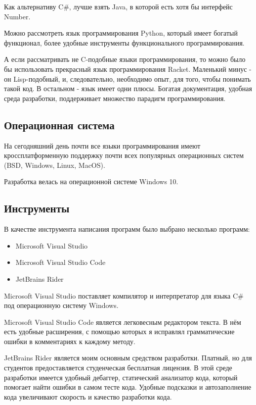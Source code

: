 Как альтернативу C\#, лучше взять Java, в которой есть хотя бы интерфейс Number.

Можно рассмотреть язык программирования Python, который имеет богатый функционал, более удобные инструменты функционального программирования. 

А если рассматривать не C-подобные языки программирования, то можно было бы использовать прекрасный язык программирования Racket. Маленький минус - он Lisp-подобный, и, следовательно, необходимо опыт, для того, чтобы понимать такой код. В остальном - язык имеет одни плюсы. Богатая документация, удобная среда разработки, поддерживает множество парадигм программирования.

\subsection{Операционная система}

На сегодняшний день почти все языки программирования имеют кроссплатформенную поддержку почти всех популярных операционных систем (BSD, Windows, Linux, MacOS).

Разработка велась на операционной системе Windows 10.

\subsection{Инструменты}

В качестве инструмента написания программ было выбрано несколько программ:

\begin{itemize}
	\item Microsoft Visual Studio
	\item Microsoft Visual Studio Code
	\item JetBrains Rider
\end{itemize}

Microsoft Visual Studio поставляет компилятор и интерпретатор для языка C\# под операционную систему Windows.

Microsoft Visual Studio Code является легковесным редактором текста. В нём есть удобные расширения, с помощью которых я исправлял грамматические ошибки в комментариях к каждому методу.

JetBrains Rider является моим основным средством разработки. Платный, но для студентов предоставляется студенческая бесплатная лицензия. В этой среде разработки имеется удобный дебаггер, статический анализатор кода, который помогает найти ошибки в самом тесте кода. Удобные подсказки и автозаполнение кода увеличивают скорость и качество разработки кода.

